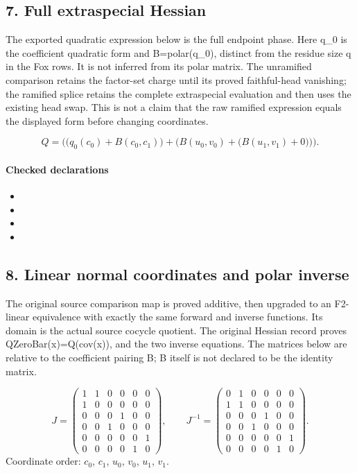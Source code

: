 \subsection*{7. Full extraspecial Hessian}
The exported quadratic expression below is the full endpoint phase. Here q\_0 is the coefficient quadratic form and B=polar(q\_0), distinct from the residue size q in the Fox rows. It is not inferred from its polar matrix. The unramified comparison retains the factor-set charge until its proved faithful-head vanishing; the ramified splice retains the complete extraspecial evaluation and then uses the existing head swap. This is not a claim that the raw ramified expression equals the displayed form before changing coordinates.

\[Q=\bigl(\bigl(q_0(c_0)+B(c_0,c_1)\bigr)+\bigl(B(u_{0},v_{0})+\bigl(B(u_{1},v_{1})+0\bigr)\bigr)\bigr).\]
\paragraph{Checked declarations}
\begin{itemize}
\item {}
\item {}
\item {}
\item {}
\end{itemize}

\subsection*{8. Linear normal coordinates and polar inverse}
The original source comparison map is proved additive, then upgraded to an F2-linear equivalence with exactly the same forward and inverse functions. Its domain is the actual source cocycle quotient. The original Hessian record proves QZeroBar(x)=Q(cov(x)), and the two inverse equations. The matrices below are relative to the coefficient pairing B; B itself is not declared to be the identity matrix.

\[J=\begin{pmatrix}1&1&0&0&0&0\\1&0&0&0&0&0\\0&0&0&1&0&0\\0&0&1&0&0&0\\0&0&0&0&0&1\\0&0&0&0&1&0\end{pmatrix},\qquad J^{-1}=\begin{pmatrix}0&1&0&0&0&0\\1&1&0&0&0&0\\0&0&0&1&0&0\\0&0&1&0&0&0\\0&0&0&0&0&1\\0&0&0&0&1&0\end{pmatrix}.\]
Coordinate order: $c_0$, $c_1$, $u_{0}$, $v_{0}$, $u_{1}$, $v_{1}$.
